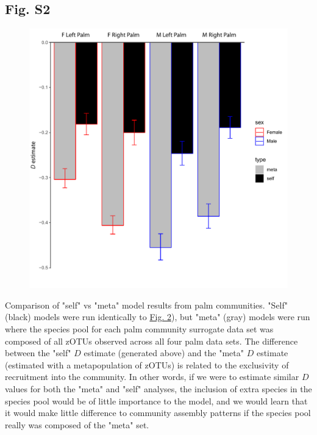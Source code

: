 \documentclass{article}
\begin{document}
{\subsection{Fig. S2}\label{sec:figureS2}
\begin{figure}[ht]
	\centering
	\includegraphics[scale=0.80]{figs/Fig_S2.pdf}
\end{figure}
Comparison of "self" vs "meta" model results from palm communities. "Self" (black) models were run identically to \hyperref[sec:figure2]{Fig. 2}), but "meta" (gray) models were run where the species pool for each palm community surrogate data set was composed of all zOTUs observed across all four palm data sets. The difference between the "self" \(D\) estimate (generated above) and the "meta" \(D\) estimate (estimated with a metapopulation of zOTUs) is related to the exclusivity of recruitment into the community. In other words, if we were to estimate similar \(D\) values for both the "meta" and "self" analyses, the inclusion of extra species in the species pool would be of little importance to the model, and we would learn that it would make little difference to community assembly patterns if the species pool really was composed of the "meta" set.
\newpage

}
\end{document}
